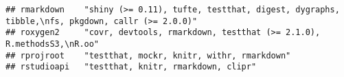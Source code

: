 \documentclass[]{book}
\begin{document}
\begin{verbatim}
## rmarkdown    "shiny (>= 0.11), tufte, testthat, digest, dygraphs, tibble,\nfs, pkgdown, callr (>= 2.0.0)"                                                                                                                                                                                                                                                                                                                                                                                                                                                                                                                                                                                                              
## roxygen2     "covr, devtools, rmarkdown, testthat (>= 2.1.0), R.methodsS3,\nR.oo"                                                                                                                                                                                                                                                                                                                                                                                                                                                                                                                                                                                                                                      
## rprojroot    "testthat, mockr, knitr, withr, rmarkdown"                                                                                                                                                                                                                                                                                                                                                                                                                                                                                                                                                                                                                                                                
## rstudioapi   "testthat, knitr, rmarkdown, clipr"                                                                                                                                                                                                                                                                                                                                                                                                                                                                                                                                                                                                                                                                       

\end{verbatim}
\end{document}
